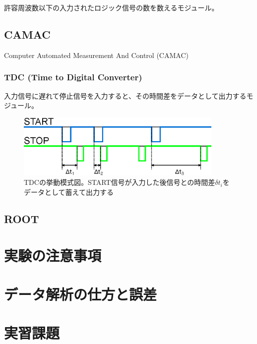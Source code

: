 \documentclass{jarticle}
\begin{document}
	  許容周波数以下の入力されたロジック信号の数を数えるモジュール。
	  
	  
	  
	  

  \subsection{CAMAC}
  Computer Automated Measurement And Control (CAMAC)

  \subsubsection*{TDC (Time to Digital Converter)}

  入力信号に遅れて停止信号を入力すると、その時間差をデータとして出力するモジュール。

	  \begin{figure}[H]
	   \begin{center}
	    \includegraphics[width = 100mm]{./picture/TDC.eps}
	   \end{center}
	   \caption{TDCの挙動模式図。START信号が入力した後信号との時間差$\delta t_{i}$をデータとして蓄えて出力する}
	   \label{Fig:TDC}
	  \end{figure}


  
  	  \subsection{ROOT}
	  
 	  \section{実験の注意事項}
	  
 \section{データ解析の仕方と誤差}
 
 
 	  \section{実習課題}
\end{document}
